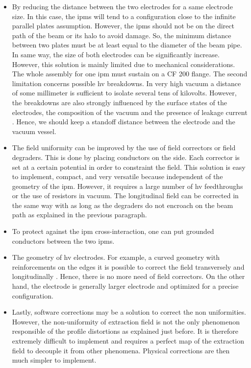 \begin{refsection}
  \begin{itemize}
    \item By reducing the distance between the two electrodes for a same electrode size. In this case, the \acrshort{ipm}s will tend to a configuration close to the infinite parallel plates assumption. However, the \acrshort{ipm}s should not be on the direct path of the beam or its halo to avoid damage. So, the minimum distance between two plates must be at least equal to the diameter of the beam pipe. In same way, the size of both electrodes can be significantly increase. However, this solution is mainly limited due to mechanical considerations. The whole assembly for one \acrshort{ipm} must sustain on a CF 200 flange. The second limitation concerns possible \acrshort{hv} breakdowns. In very high vacuum a distance of some millimeter is sufficient to isolate several tens of kilovolts. However, the breakdowns are also strongly influenced by the surface states of the electrodes, the composition of the vacuum and the presence of leakage current \cite{Latham1995}. Hence, we should keep a standoff distance between the electrode and the vacuum vessel.
    \item The field uniformity can be improved by the use of field correctors or field degraders. This is done by placing conductors on the side. Each corrector is set at a certain potential in order to constraint the field. This solution is easy to implement, compact, and very versatile because independent of the geometry of the \acrshort{ipm}. However, it requires a large number of \acrshort{hv} feedthroughs or the use of resistors in vacuum. The longitudinal field can be corrected in the same way with as long as the degraders do not encroach on the beam path as explained in the previous paragraph.
    \item To protect against the \acrshort{ipm} cross-interaction, one can put grounded conductors between the two \acrshort{ipm}s.
    \item The geometry of \acrshort{hv} electrodes. For example, a curved geometry with reinforcements on the edges it is possible to correct the field transversely and longitudinally \cite{Bartkoski2014}. Hence, there is no more need of field correctors. On the other hand, the electrode is generally larger electrode and optimized for a precise configuration.
    \item Lastly, software corrections may be a solution to correct the non uniformities. However, the non-uniformity of extraction field is not the only phenomenon responsible of the profile distortions as explained just before. It is therefore extremely difficult to implement and requires a perfect map of the extraction field to decouple it from other phenomena. Physical corrections are then much simpler to implement.
  \end{itemize}



\end{refsection}
